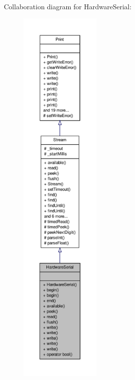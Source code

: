 Collaboration diagram for Hardware\-Serial\-:
\nopagebreak
\begin{figure}[H]
\begin{center}
\leavevmode
\includegraphics[height=550pt]{class_hardware_serial__coll__graph}
\end{center}
\end{figure}
